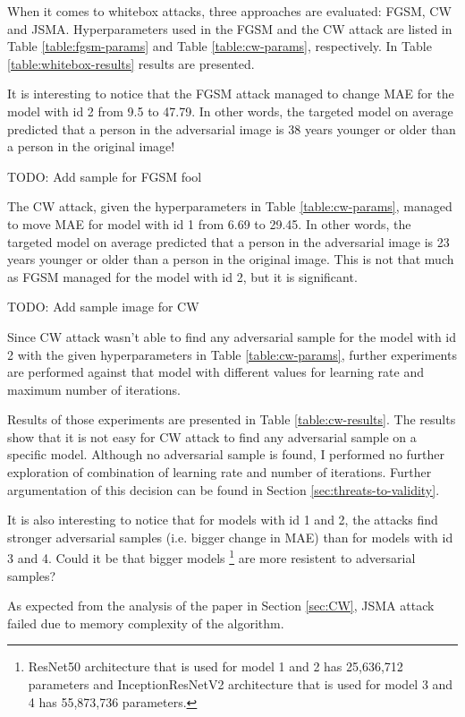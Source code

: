 When it comes to whitebox attacks, three approaches are evaluated: FGSM, CW and JSMA. Hyperparameters used in the FGSM and the CW attack are listed in Table \ref{table:fgsm-params} and Table \ref{table:cw-params}, respectively. In Table \ref{table:whitebox-results} results are presented.

It is interesting to notice that the FGSM attack managed to change MAE for the model with id 2 from 9.5 to 47.79. In other words, the targeted model on average predicted that a person in the adversarial image is 38 years younger or older than a person in the original image!

TODO: Add sample for FGSM fool

The CW attack, given the hyperparameters in Table \ref{table:cw-params}, managed to move MAE for model with id 1 from 6.69 to 29.45.  In other words, the targeted model on average predicted that a person in the adversarial image is 23 years younger or older than a person in the original image. This is not that much as FGSM managed for the model with id 2, but it is significant.

TODO: Add sample image for CW

Since CW attack wasn't able to find any adversarial sample for the model with id 2 with the given hyperparameters in Table \ref{table:cw-params}, further experiments are performed against that model with different values for learning rate and maximum number of iterations.

Results of those experiments are presented in Table \ref{table:cw-results}. The results show that it is not easy for CW attack to find any adversarial sample on a specific model. Although no adversarial sample is found, I performed no further exploration of combination of learning rate and number of iterations. Further argumentation of this decision can be found in Section \ref{sec:threats-to-validity}.

It is also interesting to notice that for models with id 1 and 2, the attacks find stronger adversarial samples (i.e. bigger change in MAE) than for models with id 3 and 4. Could it be that bigger models \footnote{ResNet50 architecture that is used for model 1 and 2 has 25,636,712 parameters and InceptionResNetV2  architecture that is used for model 3 and 4 has 55,873,736 parameters.} are more resistent to adversarial samples? 

As expected from the analysis of the paper \cite{DBLP:journals/corr/CarliniW16a} in Section \ref{sec:CW}, JSMA attack failed due to memory complexity of the algorithm.

